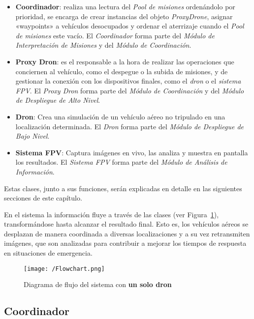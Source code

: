 \begin{itemize}
\item \textbf{Coordinador}: realiza una lectura del \textit{Pool de misiones} ordenándolo por prioridad, se encarga de crear instancias del objeto \textit{ProxyDrone}, asignar «waypoints» a vehículos desocupados y ordenar el aterrizaje cuando el \textit{Pool de misiones} este vacío. El \textit{Coordinador} forma parte del \textit{Módulo de Interpretación de Misiones} y del \textit{Módulo de Coordinación}.
\item \textbf{Proxy Dron}: es el responsable a la hora de realizar las operaciones que conciernen al vehículo, como el despegue o la subida de misiones, y de gestionar la conexión con los dispositivos finales, como el \textit{dron} o el \textit{sistema \acs{FPV}}. El \textit{Proxy Dron} forma parte del \textit{Módulo de Coordinación} y del \textit{Módulo de Despliegue de Alto Nivel}.
\item \textbf{Dron}: Crea una simulación de un vehículo aéreo no tripulado en una localización determinada. El \textit{Dron} forma parte del \textit{Módulo de Despliegue de Bajo Nivel}.
\item \textbf{Sistema \acs{FPV}}: Captura imágenes en vivo, las analiza y muestra en pantalla los resultados. El \textit{Sistema \acs{FPV}} forma parte del \textit{Módulo de Análisis de Información}.
\end{itemize}

Estas clases, junto a sus funciones, serán explicadas en detalle en las siguientes secciones de este capítulo. 

En el sistema la información fluye a través de las clases (ver Figura~\ref{fig:diagflujo}), transformándose hasta alcanzar el resultado final. Esto es, los vehículos aéreos se desplazan de manera coordinada a diversas localizaciones y a su vez retransmiten imágenes, que son analizadas para contribuir a mejorar los tiempos de respuesta en situaciones de emergencia.

\begin{figure}[!h]
\begin{center}
\texttt{[image: /Flowchart.png]}
\caption[Diagrama de flujo del sistema con un solo dron]{Diagrama de flujo del sistema con \textbf{un solo dron}}
\label{fig:diagflujo}
\end{center}
\end{figure}

\subsection{Coordinador}
\label{sec:coordinador}

